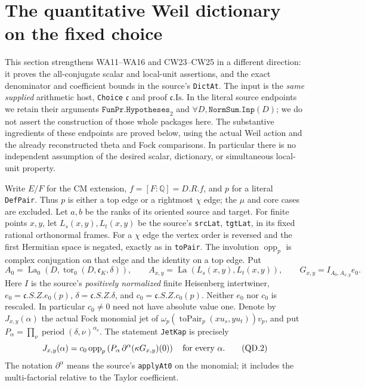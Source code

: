 \section{The quantitative Weil dictionary on the fixed choice}
\label{sec:quantitative-weil-dictionary}

This section strengthens WA11--WA16 and CW23--CW25 in a different
direction: it proves the all-conjugate scalar and local-unit assertions,
and the exact denominator and coefficient bounds in the source's
\texttt{DictAt}.  The input is the \emph{same supplied} arithmetic host,
\texttt{Choice} $\mathfrak c$ and proof $\mathfrak c.\mathrm{Is}$.  In
the literal source endpoints we retain their arguments
$\texttt{FunPr.Hypotheses}_2$ and $\forall D,\texttt{NormSum.Inp}(D)$;
we do not assert the construction of those whole packages here.
The substantive ingredients of these endpoints are proved below,
using the actual Weil action and the already reconstructed theta and
Fock comparisons.  In particular there is no independent assumption
of the desired scalar, dictionary, or simultaneous local-unit property.

Write $E/F$ for the CM extension, $f=[F:\mathbb Q]=D.R.f$, and
$p$ for a literal \texttt{DefPair}.  Thus $p$ is either a top edge or
a rightmost $\chi$ edge; the $\mu$ and core cases are excluded.
Let $a,b$ be the ranks of its oriented source and target.  For finite
points $x,y$, let $L_s(x,y),L_t(x,y)$ be the source's
\texttt{srcLat}, \texttt{tgtLat}, in its fixed rational orthonormal
frames.  For a $\chi$ edge the vertex order is reversed and the first
Hermitian space is negated, exactly as in \texttt{toPair}.
The involution $\operatorname{opp}_p$ is complex conjugation on that
edge and the identity on a top edge.  Put
\[
 A_0=\operatorname{La}_0(D,\operatorname{tor}_0(D,\mathfrak c_K,\delta)),
 \qquad A_{x,y}=\operatorname{La}(L_s(x,y),L_t(x,y)),
 \qquad G_{x,y}=I_{A_0,A_{x,y}}e_0.                         \tag{QD.1}
\]
Here $I$ is the source's \emph{positively normalized} finite
Heisenberg intertwiner, $e_0=\mathfrak c.S.Z.e_0(p)$,
$\delta=\mathfrak c.S.Z.\delta$, and $c_0=\mathfrak c.S.Z.c_0(p)$.
Neither $e_0$ nor $c_0$ is rescaled.  In particular $c_0\ne0$ need
not have absolute value one.  Denote by $J_{x,y}(\alpha)$ the actual
Fock monomial jet of
$\omega_p(\operatorname{toPair}_p(xu_s,yu_t))v_p$, and put
$P_\alpha=\prod_\nu\operatorname{period}(\delta,\nu)^{\alpha_\nu}$.
The statement \texttt{JetKap} is precisely
\[
 J_{x,y}(\alpha)=c_0\operatorname{opp}_p
       \left(P_\alpha\,\partial^\alpha(\kappa G_{x,y})(0)\right)
                         \quad\hbox{for every }\alpha.     \tag{QD.2}
\]
The notation $\partial^\alpha$ means the source's
\texttt{applyAt0} on the monomial; it includes the multi-factorial
relative to the Taylor coefficient.


